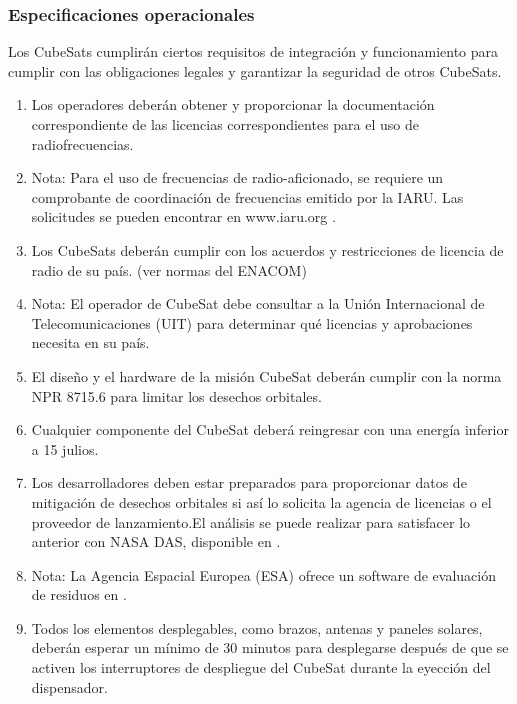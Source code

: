 \documentclass[12pt]{article}
\begin{document}
	\subsubsection{Especificaciones operacionales}
	Los CubeSats cumplirán ciertos requisitos de integración y funcionamiento para cumplir con las obligaciones legales y garantizar la seguridad de otros CubeSats.
	
	\begin{enumerate}
		\item Los operadores deberán obtener y proporcionar la documentación correspondiente de las licencias correspondientes para el uso de radiofrecuencias.
		
		\item Nota: Para el uso de frecuencias de radio-aficionado, se requiere un comprobante de coordinación de frecuencias emitido por la IARU. Las solicitudes se pueden encontrar en www.iaru.org \cite{IARU2025}.
		
		\item Los CubeSats deberán cumplir con los acuerdos y restricciones de licencia de radio de su país. (ver normas del ENACOM)
		
		\item Nota: El operador de CubeSat debe consultar a la Unión Internacional de Telecomunicaciones (UIT) \cite{ITU2025} para determinar qué licencias y aprobaciones necesita en su país.
		
		\item El diseño y el hardware de la misión CubeSat deberán cumplir con la norma NPR 8715.6 \cite{NASA87156E} para limitar los desechos orbitales.
		
		\item Cualquier componente del CubeSat deberá reingresar con una energía inferior a 15 julios.
		
		\item Los desarrolladores deben estar preparados para proporcionar datos de mitigación de desechos orbitales si así lo solicita la agencia de licencias o el proveedor de lanzamiento.El análisis se puede realizar para satisfacer lo anterior con NASA DAS, disponible en \cite{NASA_ODPO_Mitigation2025}.
		
		\item Nota: La Agencia Espacial Europea (ESA) ofrece un software de evaluación de residuos en \cite{ESA_SDUP2025}.
		
		\item Todos los elementos desplegables, como brazos, antenas y paneles solares, deberán esperar un mínimo de 30 minutos para desplegarse después de que se activen los interruptores de despliegue del CubeSat durante la eyección del dispensador.
		

\end{enumerate}
\end{document}
